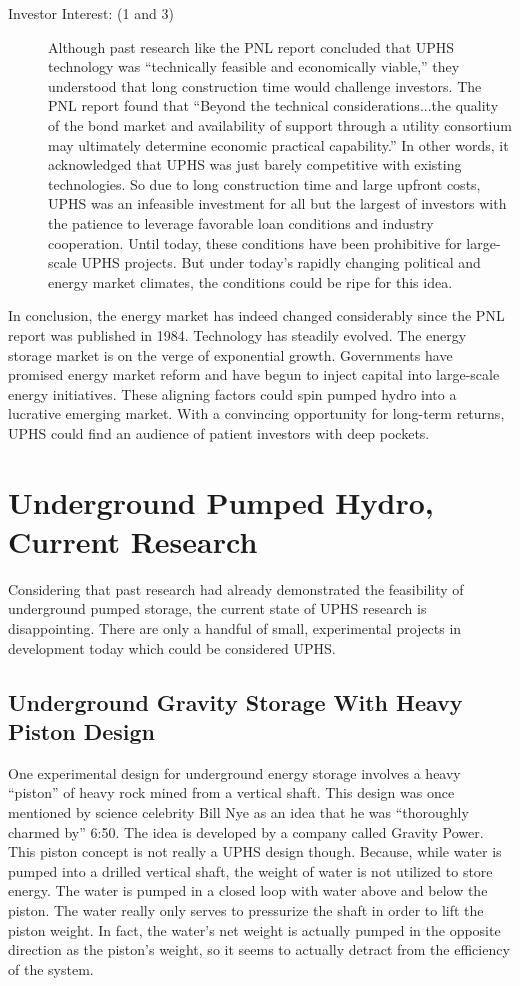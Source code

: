 \documentclass[hidelinks,12pt,a4paper]{article}
\begin{document}
{\begin{description}
    \item[Investor Interest: (1 and 3)] Although past research like the PNL report concluded that UPHS technology was “technically feasible and economically viable,” they understood that long construction time would challenge investors. The PNL report found that “Beyond the technical considerations...the quality of the bond market and availability of support through a utility consortium may ultimately determine economic practical capability.” In other words, it acknowledged that UPHS was just barely competitive with existing technologies. So due to long construction time and large upfront costs, UPHS was an infeasible investment for all but the largest of investors with the patience to leverage favorable loan conditions and industry cooperation. Until today, these conditions have been prohibitive for large-scale UPHS projects. But under today's rapidly changing political and energy market climates, the conditions could be ripe for this idea.
\end{description}
}

In conclusion, the energy market has indeed changed considerably since the PNL report was published in 1984. Technology has steadily evolved. The energy storage market is on the verge of exponential growth. Governments have promised energy market reform and have begun to inject capital into large-scale energy initiatives. These aligning factors could spin pumped hydro into a lucrative emerging market. With a convincing opportunity for long-term returns, UPHS could find an audience of patient investors with deep pockets.


\pagebreak[4]
\section{Underground Pumped Hydro, Current Research}
Considering that past research had already demonstrated the feasibility of underground pumped storage, the current state of UPHS research is disappointing. There are only a handful of small, experimental projects in development today which could be considered UPHS.

\subsection{Underground Gravity Storage With Heavy Piston Design}
One experimental design for underground energy storage involves a heavy “piston” of heavy rock mined from a vertical shaft. This design was once mentioned by science celebrity Bill Nye as an idea that he was “thoroughly charmed by” \cite{BillNyeBigThinkVideo} 6:50. The idea is developed by a company called Gravity Power. This piston concept is not really a UPHS design though. Because, while water is pumped into a drilled vertical shaft, the weight of water is not utilized to store energy. The water is pumped in a closed loop with water above and below the piston. The water really only serves to pressurize the shaft in order to lift the piston weight. In fact, the water's net weight is actually pumped in the opposite direction as the piston's weight, so it seems to actually detract from the efficiency of the system. \cite{GravityPowerNewTakeOnPumpedHydroEnergyStorage}
\end{document}
